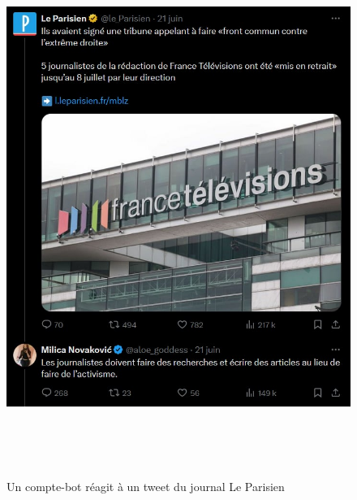 \documentclass[
]{article}
\begin{document}
\begin{figure}
\centering
\includegraphics[width=15.092cm,height=17.505cm]{../assets/Pictures/10000000000002C90000033B3685D1B2CD1D3AA1.jpg}
\caption{Un compte-bot réagit à un tweet du journal Le Parisien}\label{fig:fig-2--2-6}
\end{figure}
\end{document}
